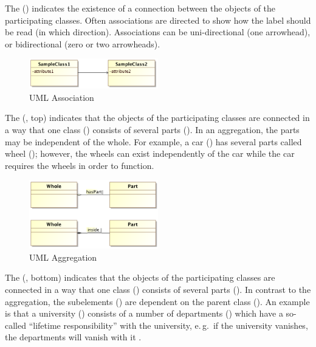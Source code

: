 The  () indicates the existence of a connection between the objects of the participating classes. Often associations are directed to show how the label should be read (in which direction). Associations can be uni-directional (one arrowhead), or bidirectional (zero or two arrowheads). 
\begin{figure}[h]
\centering
\includegraphics[width=0.5\textwidth]{images/uml/umlAssociation.png}
\caption{UML Association}
\label{fig:umlAssociation}
\end{figure}

 
The  (, top) indicates that the objects of the participating classes are connected in a way that one class () consists of several parts (). In an aggregation, the parts may be independent of the whole. For example, a car ()  has several parts called wheel (); however, the wheels can exist independently of the car while the car requires the wheels in order to function.
\begin{figure}[h]
\centering
\includegraphics[width=0.5\textwidth]{images/uml/umlAggregation.png}
\caption{UML Aggregation}
\label{fig:umlAggregation}
\end{figure}

The  (, bottom) indicates that the objects of the participating classes are connected in a way that one class () consists of several parts (). In contrast to the aggregation, the subelements () are dependent on the parent class (). An example is that a university () consists of a number of departments () which have a so-called ``lifetime responsibility'' with the university, e.\,g.\ if the university vanishes,  the departments will vanish with it \citep{Bel03}.

